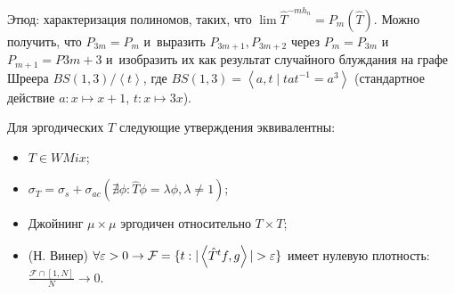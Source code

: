 \documentclass{article}
\begin{document}
Этюд: характеризация полиномов, таких, что $\lim \hat T^{-mh_n} = P_m(\hat T)$.
Можно получить, что $P_{3m} = P_m$ и~выразить $P_{3m+1}, P_{3m+2}$ через
$P_{m}=P_{3m}$ и~$P_{m+1}=P{3m+3}$ и~изобразить их как результат случайного
блуждания на графе Шреера $BS(1,3) / \left<t\right>$, где $BS(1,3)=\left<a,t\mid
tat^{-1} = a^3\right>$ (стандартное действие $a: x \mapsto x + 1$, $t: x \mapsto
3x$).

\begin{theorem}
	Для эргодических $T$ следующие утверждения эквивалентны:
	\begin{itemize}
		\item $T \in WMix$;
		\item $\sigma_T = \sigma_s + \sigma_{ac} (\nexists \phi: \hat T\phi =
			\lambda \phi, \lambda \ne 1)$;
		\item Джойнинг $\mu \times \mu$ эргодичен относительно $T \times T$;
		\item (Н. Винер) $\forall \varepsilon > 0 \rightarrow \mathcal F = \{t:
			|\left<\hat T^t f, g\right>| > \varepsilon \}$ имеет нулевую плотность:
			$\frac{\mathcal{F} \cap [1, N]}{N} \rightarrow 0$.
	\end{itemize}
\end{theorem}
\end{document}
